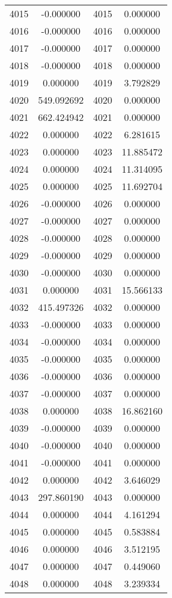 \documentclass[12pt]{article}
\begin{document}
\begin{longtable}{@{}cccc@{}}
4015 & -0.000000 & 4015 & 0.000000 \\
4016 & -0.000000 & 4016 & 0.000000 \\
4017 & -0.000000 & 4017 & 0.000000 \\
4018 & -0.000000 & 4018 & 0.000000 \\
4019 & 0.000000 & 4019 & 3.792829 \\
4020 & 549.092692 & 4020 & 0.000000 \\
4021 & 662.424942 & 4021 & 0.000000 \\
4022 & 0.000000 & 4022 & 6.281615 \\
4023 & 0.000000 & 4023 & 11.885472 \\
4024 & 0.000000 & 4024 & 11.314095 \\
4025 & 0.000000 & 4025 & 11.692704 \\
4026 & -0.000000 & 4026 & 0.000000 \\
4027 & -0.000000 & 4027 & 0.000000 \\
4028 & -0.000000 & 4028 & 0.000000 \\
4029 & -0.000000 & 4029 & 0.000000 \\
4030 & -0.000000 & 4030 & 0.000000 \\
4031 & 0.000000 & 4031 & 15.566133 \\
4032 & 415.497326 & 4032 & 0.000000 \\
4033 & -0.000000 & 4033 & 0.000000 \\
4034 & -0.000000 & 4034 & 0.000000 \\
4035 & -0.000000 & 4035 & 0.000000 \\
4036 & -0.000000 & 4036 & 0.000000 \\
4037 & -0.000000 & 4037 & 0.000000 \\
4038 & 0.000000 & 4038 & 16.862160 \\
4039 & -0.000000 & 4039 & 0.000000 \\
4040 & -0.000000 & 4040 & 0.000000 \\
4041 & -0.000000 & 4041 & 0.000000 \\
4042 & 0.000000 & 4042 & 3.646029 \\
4043 & 297.860190 & 4043 & 0.000000 \\
4044 & 0.000000 & 4044 & 4.161294 \\
4045 & 0.000000 & 4045 & 0.583884 \\
4046 & 0.000000 & 4046 & 3.512195 \\
4047 & 0.000000 & 4047 & 0.449060 \\
4048 & 0.000000 & 4048 & 3.239334 \\

\end{longtable}
\end{document}
